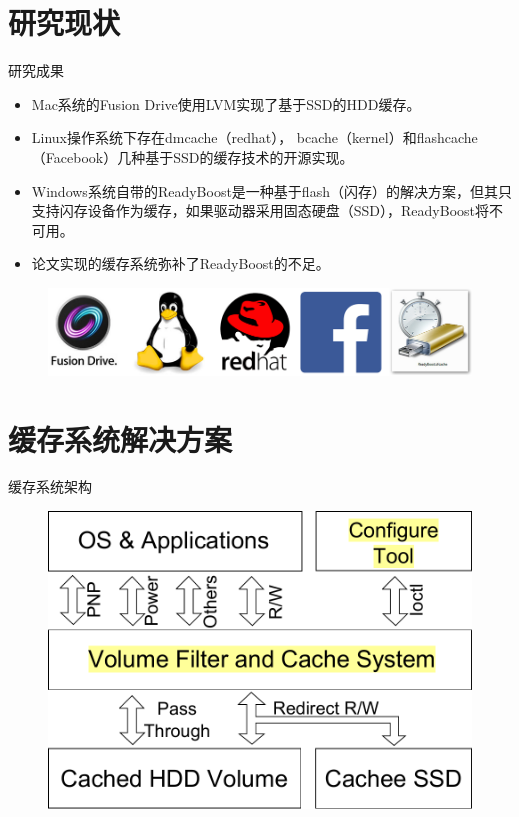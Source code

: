 \documentclass[compress]{beamer}
\begin{document}
\section{研究现状}
\begin{frame}{研究成果}
\begin{itemize}
    \item Mac系统的Fusion Drive使用LVM实现了基于SSD的HDD缓存。
    \item Linux操作系统下存在dmcache（redhat）， bcache（kernel）和flashcache（Facebook）几种基于SSD的缓存技术的开源实现。
    \item Windows系统自带的ReadyBoost是一种基于flash（闪存）的解决方案，但其只支持闪存设备作为缓存，如果驱动器采用固态硬盘（SSD），ReadyBoost将不可用。
    \item 论文实现的缓存系统弥补了ReadyBoost的不足。
\end{itemize}
\begin{figure}
\includegraphics[width=0.5\linewidth]{./fig/research-status}
\end{figure}
\end{frame}

\section{缓存系统解决方案}
\begin{frame}{缓存系统架构}
\begin{figure}
\includegraphics[width=0.8\linewidth]{./fig/sys-overview}
\end{figure}
\end{frame}
\end{document}
